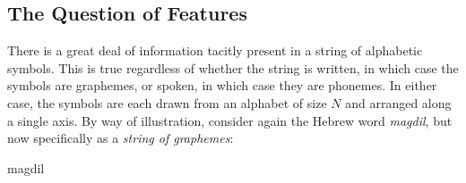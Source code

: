 	 \subsection{The Question of Features} There is a great deal of information tacitly present in a string of alphabetic symbols.
	 This is true regardless of whether the string is written, in which case the symbols are graphemes, or spoken,
	 in which case they are phonemes. In either case, the symbols are each drawn from an alphabet of size $N$ and arranged along a single axis.
By way of illustration, consider again the Hebrew word \textit{magdil}, but now specifically as a \emph{string of graphemes}: 
\begin{center}
{\fontsize{12pt}{14pt}\selectfont magdil}
\end{center}
